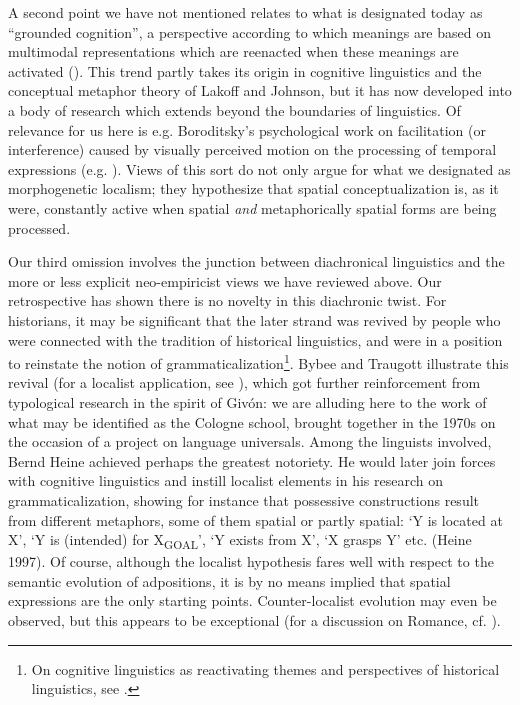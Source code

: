 \documentclass[output=paper]{langscibook}
\begin{document}
A second point we have not mentioned relates to what is designated today as “grounded cognition”, a perspective according to which meanings are based on multimodal representations which are reenacted when these meanings are activated (\citealt{barsalou_grounded_2008}). This trend partly takes its origin in cognitive linguistics and the conceptual metaphor theory of Lakoff and Johnson, but it has now developed into a body of research which extends beyond the boundaries of linguistics. Of relevance for us here is e.g. Boroditsky’s psychological work on facilitation (or interference) caused by visually perceived motion on the processing of temporal expressions (e.g. \citealt{boroditsky_does_2001}). Views of this sort do not only argue for what we designated as morphogenetic localism; they hypothesize that spatial conceptualization is, as it were, constantly active when spatial \textit{and} metaphorically spatial forms are being processed.

Our third omission involves the junction between diachronical linguistics and the more or less explicit neo-empiricist views we have reviewed above. Our retrospective has shown there is no novelty in this diachronic twist. For historians, it may be significant that the later strand was revived by people who were connected with the tradition of historical linguistics, and were in a position to reinstate the notion of grammaticalization\footnote{\textrm{ On cognitive linguistics as reactivating themes and perspectives of historical linguistics, see \citet{geeraerts_theories_2010}. }}. Bybee and Traugott illustrate this revival (for a localist application, see \citet{traugott_spatial_1975}), which got further reinforcement from typological research in the spirit of Givón: we are alluding here to the work of what may be identified as the Cologne school, brought together in the 1970s on the occasion of a project on language universals. Among the linguists involved, Bernd Heine achieved perhaps the greatest notoriety. He would later join forces with cognitive linguistics and instill localist elements in his research on grammaticalization, showing for instance that possessive constructions result from different metaphors, some of them spatial or partly spatial: ‘Y is located at X’, ‘Y is (intended) for X\textsubscript{GOAL}’, ‘Y exists from X’, ‘X grasps Y’ etc. (Heine 1997). Of course, although the localist hypothesis fares well with respect to the semantic evolution of adpositions, it is by no means implied that spatial expressions are the only starting points. Counter-localist evolution may even be observed, but this appears to be exceptional (for a discussion on Romance, cf. \citet{fagard_espace_2010}).
\end{document}
